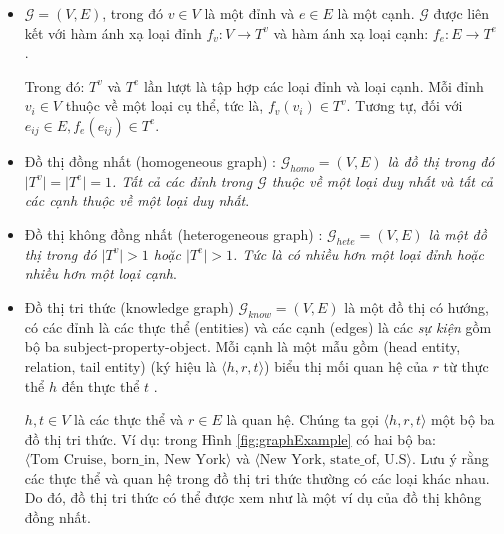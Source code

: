 \begin{itemize}
	\item \begin{definition}[Đồ thị]\label{def:defGraph}
		\(\mathcal{G} = (V, E)\), trong đó \(v \in V\) là một đỉnh và \(e \in E\) là một cạnh. \(\mathcal{G}\) được liên kết với hàm ánh xạ loại đỉnh \(f_v: V \to T^v\) và hàm ánh xạ loại cạnh: \(f_e: E \to T^e\) .
	\end{definition}
	
	Trong đó: \(T^v\) và \(T^e\) lần lượt là tập hợp các loại đỉnh và loại cạnh. Mỗi đỉnh \(v_i \in V\) thuộc về một loại cụ thể, tức là, \(f_v(v_i) \in T^v\). Tương tự, đối với \(e_{ij} \in E, f_e (e_{ij}) \in T^e\).
	
	\item
	\begin{definition}\label{def:homogeneous}
		Đồ thị đồng nhất (homogeneous graph) : \textit{ $\mathcal{G}_{homo} = (V, E)$ là đồ thị trong đó $\mid T^v \mid = \mid T^e \mid = 1$. Tất cả các đỉnh trong $\mathcal{G}$ thuộc về một loại duy nhất và tất cả các cạnh thuộc về một loại duy nhất}.
	\end{definition}
	
	\item
	\begin{definition}\label{def:heterogeneous}
		Đồ thị không đồng nhất (heterogeneous graph) : \textit{$\mathcal{G}_{hete} = (V, E)$ là một đồ thị trong đó $\mid T^v \mid > 1$ hoặc $\mid T^e \mid > 1$. Tức là có nhiều hơn một loại đỉnh hoặc nhiều hơn một loại cạnh}.
	\end{definition}
	
	\item
	\begin{definition}\label{def:knowledgeGraph}
		Đồ thị tri thức (knowledge graph)
		$\mathcal{G}_{know} = (V, E)$ là một đồ thị có hướng, có các đỉnh là các thực thể (entities) và các cạnh (edges) là các \textit{sự kiện} gồm bộ ba subject-property-object. Mỗi cạnh là một mẫu gồm (head entity, relation, tail entity) (ký hiệu là $\langle h, r, t \rangle$) biểu thị mối quan hệ của $r$ từ thực thể $h$ đến thực thể $t$ .
	\end{definition}
	$h, t \in V$ là các thực thể và $r \in E$ là quan hệ. Chúng ta gọi $\langle h, r, t \rangle$ một bộ ba đồ thị tri thức. Ví dụ: trong Hình \ref{fig:graphExample} có hai bộ ba: $\langle \text{Tom\ Cruise,\ born_in,\ New\ York} \rangle$ và $\langle \text{New York, state_of, U.S} \rangle$. Lưu ý rằng các thực thể và quan hệ trong đồ thị tri thức thường có các loại khác nhau. Do đó, đồ thị tri thức có thể được xem như là một ví dụ của đồ thị không đồng nhất.
	
\end{itemize}

